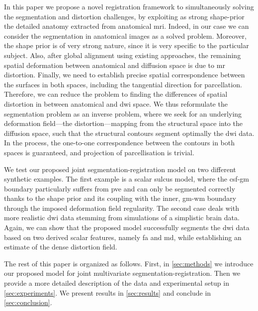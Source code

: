 In this paper we propose a novel registration framework to simultaneously
solving the segmentation and distortion challenges, by exploiting as strong 
shape-prior the detailed anatomy extracted from anatomical \ac{mri}. Indeed, in our case we can consider the segmentation in anatomical images as a solved problem. Moreover, the shape prior is of very strong nature, since it is very specific to the particular subject. Also, after global alignment using existing approaches, the remaining spatial deformation between anatomical and diffusion space is due to \ac{mr} distortion. Finally, we need to establish precise spatial correspondence between the surfaces in both spaces, including the tangential direction for parcellation. Therefore, we can reduce the problem to finding the differences of spatial distortion in between anatomical and \ac{dwi} space. We thus reformulate the segmentation problem as an inverse problem, where we seek for an underlying deformation field---the distortion---mapping 
from the structural space into the diffusion space, such that the structural contours segment optimally the \ac{dwi} data. In the process, the one-to-one correspondence between the contours in both spaces is guaranteed, and projection of parcellisation is trivial.

We test our proposed joint segmentation-registration model on two different synthetic examples. The first example is a scalar sulcus model, where the \ac{csf}-\ac{gm} boundary particularly suffers from \ac{pve} and can only be segmented correctly thanks to the shape prior and its coupling with the inner, \ac{gm}-\ac{wm} boundary through the imposed deformation field regularity. The second case deals with more realistic \ac{dwi} data stemming from simulations of a simplistic brain data. Again, we can show that the proposed model successfully segments the \ac{dwi} data based on two derived scalar features, namely \ac{fa} and \ac{md}, while establishing an estimate of the dense distortion field.

The rest of this paper is organized as follows. First, in \autoref{sec:methods} we introduce our proposed model for joint multivariate segmentation-registration. Then we provide a more detailed description of the data and experimental setup in \autoref{sec:experiments}. We present results in \autoref{sec:results} and conclude in \autoref{sec:conclusion}.